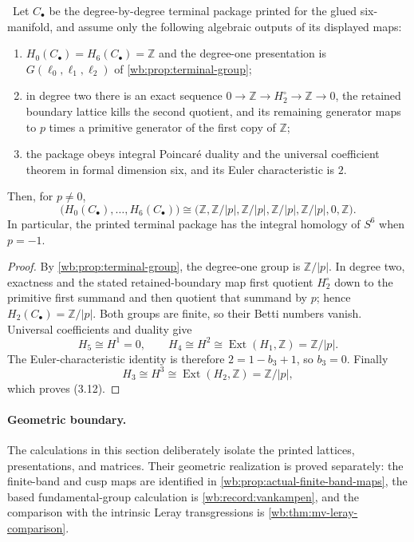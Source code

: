 \begin{proposition}
\label{wb:prop:terminal-all-degree}
\ Let $C_\bullet$ be the degree-by-degree terminal package printed
for the glued six-manifold, and assume only the following algebraic outputs
of its displayed maps:
\begin{enumerate}[label=(\roman*)]
\item $H_0(C_\bullet)=H_6(C_\bullet)=\mathbb Z$ and the degree-one
presentation is $G(\ell_0,\ell_1,\ell_2)$ of
\cref{wb:prop:terminal-group};
\item in degree two there is an exact sequence
$0\to\mathbb Z\to H_2^\circ\to\mathbb Z\to0$, the retained boundary
lattice kills the second quotient, and its remaining generator maps to
$p$ times a primitive generator of the first copy of $\mathbb Z$;
\item the package obeys integral Poincar\'e duality and the universal
coefficient theorem in formal dimension six, and its Euler characteristic
is $2$.
\end{enumerate}
Then, for $p\ne0$,
\[
 \bigl(H_0(C_\bullet),\ldots,H_6(C_\bullet)\bigr)
 \cong
 \bigl(\mathbb Z,\mathbb Z/|p|,\mathbb Z/|p|,
 \mathbb Z/|p|,\mathbb Z/|p|,0,\mathbb Z\bigr).
\tag{3.12}
\]
In particular, the printed terminal package has the integral homology of
$S^6$ when $p=-1$.
\end{proposition}

\begin{proof}
By \cref{wb:prop:terminal-group}, the degree-one group is
$\mathbb Z/|p|$.  In degree two, exactness and the stated retained-boundary
map first quotient $H_2^\circ$ down to the primitive first summand and then
quotient that summand by $p$; hence $H_2(C_\bullet)=\mathbb Z/|p|$.
Both groups are finite, so their Betti numbers vanish.  Universal
coefficients and duality give
\[
 H_5\cong H^1=0,
 \qquad
 H_4\cong H^2\cong
 \operatorname{Ext}(H_1,\mathbb Z)=\mathbb Z/|p|.
\]
The Euler-characteristic identity is therefore
$2=1-b_3+1$, so $b_3=0$.  Finally
\[
 H_3\cong H^3\cong
 \operatorname{Ext}(H_2,\mathbb Z)=\mathbb Z/|p|,
\]
which proves (3.12).
\end{proof}

\paragraph{Geometric boundary.}
The calculations in this section deliberately isolate the printed lattices,
presentations, and matrices.  Their geometric realization is proved
separately: the finite-band and cusp maps are identified in
\cref{wb:prop:actual-finite-band-maps}, the based fundamental-group calculation
is \cref{wb:record:vankampen}, and the comparison with the intrinsic Leray
transgressions is \cref{wb:thm:mv-leray-comparison}.
